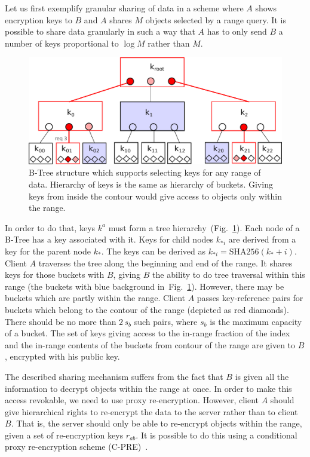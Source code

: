 \documentclass[notitlepage,longbibliography]{revtex4-1}
\newcommand{\figref}[1]{Fig.~\ref{#1}}
\begin{document}
Let us first exemplify granular sharing of data in a scheme where $A$ shows encryption keys to $B$ and $A$ shares $M$ objects selected by a range query.
It is possible to share data granularly in such a way that $A$ has to only send $B$ a number of keys proportional to $\log{M}$ rather than $M$.

\begin{figure}
    \begin{center}
        \includegraphics[width=0.7\columnwidth]{keytree.pdf}
    \end{center}
    \caption{
        B-Tree structure which supports selecting keys for any range of data.
        Hierarchy of keys is the same as hierarchy of buckets.
        Giving keys from inside the contour would give access to objects only within the range.
    }
    \label{fig:keytree}
\end{figure}

In order to do that, keys $k^a$ must form a tree hierarchy~(\figref{fig:keytree}).
Each node of a B-Tree has a key associated with it.
Keys for child nodes $k_{*i}$ are derived from a key for the parent node $k_*$.
The keys can be derived as $k_{*i} = \mbox{SHA256}(k_* + i)$.
Client $A$ traverses the tree along the beginning and end of the range.
It shares keys for those buckets with $B$, giving $B$ the ability to do tree traversal within this range (the buckets with blue background in~\figref{fig:keytree}).
However, there may be buckets which are partly within the range.
Client $A$ passes key-reference pairs for buckets which belong to the contour of the range (depicted as red diamonds).
There should be no more than $2\,s_b$ such pairs, where $s_b$ is the maximum capacity of a bucket.
The set of keys giving access to the in-range fraction of the index and the in-range contents of the buckets from contour of the range are given to $B$, encrypted with his public key.

The described sharing mechanism suffers from the fact that $B$ is given all the information to decrypt objects within the range at once.
In order to make this access revokable, we need to use proxy re-encryption.
However, client $A$ should give hierarchical rights to re-encrypt the data to the server rather than to client $B$.
That is, the server should only be able to re-encrypt objects within the range, given a set of re-encryption keys $r_{ab}$.
It is possible to do this using a conditional proxy re-encryption scheme (C-PRE)~\cite{conditional-pre-2009,unidirectional-pre-2010,conditional-pre-2014,hierarchical-pre}.
\end{document}
